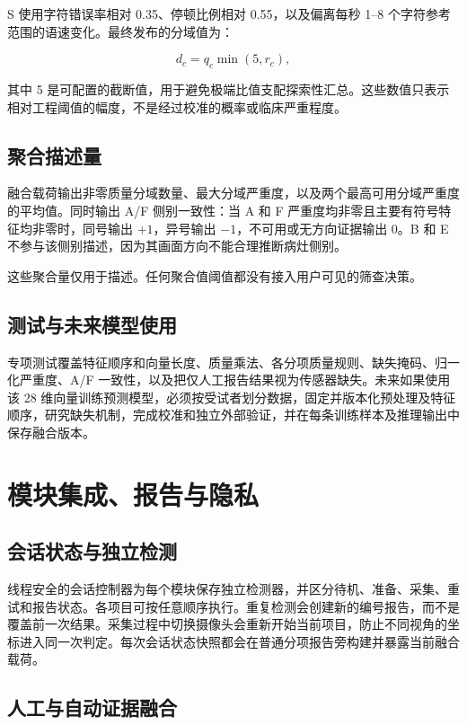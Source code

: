 \documentclass[11pt,a4paper]{article}
\begin{document}
S 使用字符错误率相对 0.35、停顿比例相对 0.55，以及偏离每秒 1--8 个字符参考范围的语速变化。最终发布的分域值为：

\begin{equation}
d_c=q_c\min(5,r_c),
\end{equation}

其中 5 是可配置的截断值，用于避免极端比值支配探索性汇总。这些数值只表示相对工程阈值的幅度，不是经过校准的概率或临床严重程度。

\subsection{聚合描述量}

融合载荷输出非零质量分域数量、最大分域严重度，以及两个最高可用分域严重度的平均值。同时输出 A/F 侧别一致性：当 A 和 F 严重度均非零且主要有符号特征均非零时，同号输出 $+1$，异号输出 $-1$，不可用或无方向证据输出 0。B 和 E 不参与该侧别描述，因为其画面方向不能合理推断病灶侧别。

这些聚合量仅用于描述。任何聚合值阈值都没有接入用户可见的筛查决策。

\subsection{测试与未来模型使用}

专项测试覆盖特征顺序和向量长度、质量乘法、各分项质量规则、缺失掩码、归一化严重度、A/F 一致性，以及把仅人工报告结果视为传感器缺失。未来如果使用该 28 维向量训练预测模型，必须按受试者划分数据，固定并版本化预处理及特征顺序，研究缺失机制，完成校准和独立外部验证，并在每条训练样本及推理输出中保存融合版本。

\section{模块集成、报告与隐私}

\subsection{会话状态与独立检测}

线程安全的会话控制器为每个模块保存独立检测器，并区分待机、准备、采集、重试和报告状态。各项目可按任意顺序执行。重复检测会创建新的编号报告，而不是覆盖前一次结果。采集过程中切换摄像头会重新开始当前项目，防止不同视角的坐标进入同一次判定。每次会话状态快照都会在普通分项报告旁构建并暴露当前融合载荷。

\subsection{人工与自动证据融合}
\end{document}
